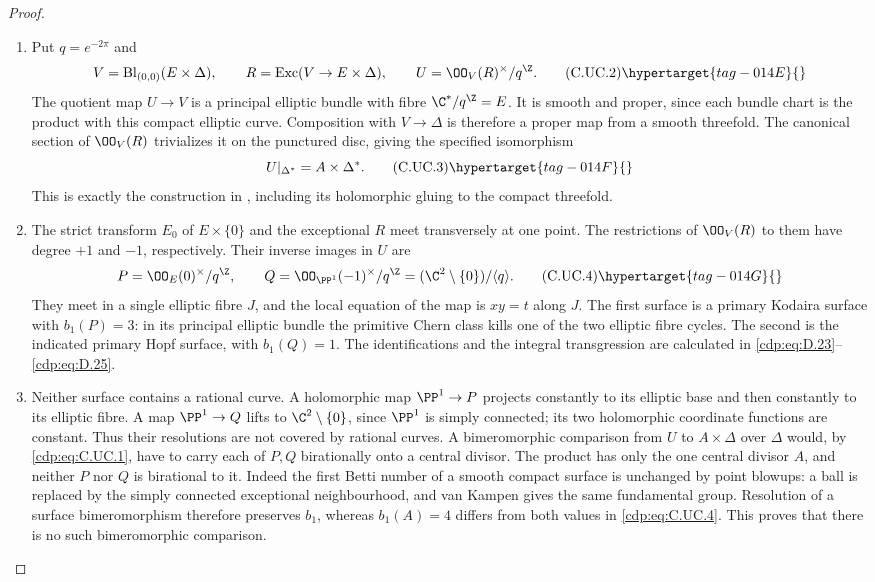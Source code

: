 \begin{proof}
\begin{enumerate}[label=\arabic*.,leftmargin=*]
\item Put
$q=e^{-2\pi}$ and
\[
 V=\operatorname{Bl}_{(0,0)}(E\times\Delta),
 \qquad R=\operatorname{Exc}(V\to E\times\Delta),
 \qquad U=\OO_V(R)^\times/q^{\Z}.
\tag{C.UC.2}\hypertarget{tag-014E}{}\label{cdp:eq:C.UC.2}
\]
The quotient map $U\to V$ is a principal
elliptic bundle with fibre $\C^*/q^{\Z}=E$.
It is smooth and proper, since each bundle
chart is the product with this compact
elliptic curve. Composition with $V\to\Delta$
is therefore a proper map from a smooth
threefold. The canonical section of
$\OO_V(R)$ trivializes it on the punctured
disc, giving the specified isomorphism
\[
                         U|_{\Delta^*}=A\times\Delta^*.
\tag{C.UC.3}\hypertarget{tag-014F}{}\label{cdp:eq:C.UC.3}
\]
This is exactly the construction in ,
including its holomorphic gluing to the
compact threefold.

\item The strict transform $E_0$ of $E\times\{0\}$
and the exceptional $R$ meet transversely at
one point. The restrictions of $\OO_V(R)$
to them have degree $+1$ and $-1$,
respectively. Their inverse images in $U$
are
\[
 P=\OO_E(0)^\times/q^{\Z},\qquad
 Q=\OO_{\PP^1}(-1)^\times/q^{\Z}
       =(\C^2\setminus\{0\})/\langle q\rangle.
\tag{C.UC.4}\hypertarget{tag-014G}{}\label{cdp:eq:C.UC.4}
\]
They meet in a single elliptic fibre $J$,
and the local equation of the map is
$xy=t$ along $J$. The first surface is a
primary Kodaira surface with $b_1(P)=3$:
in its principal elliptic bundle the primitive
Chern class kills one of the two elliptic
fibre cycles. The second is the indicated
primary Hopf surface, with $b_1(Q)=1$.
The identifications and the integral
transgression are calculated in
\eqref{cdp:eq:D.23}--\eqref{cdp:eq:D.25}.

\item Neither surface contains a rational curve.
A holomorphic map $\PP^1\to P$ projects
constantly to its elliptic base and then
constantly to its elliptic fibre. A map
$\PP^1\to Q$ lifts to $\C^2\setminus\{0\}$,
since $\PP^1$ is simply connected; its two
holomorphic coordinate functions are constant.
Thus their resolutions are not covered by
rational curves. A bimeromorphic comparison
from $U$ to $A\times\Delta$ over $\Delta$
would, by \eqref{cdp:eq:C.UC.1}, have to carry each of
$P,Q$ birationally onto a central divisor.
The product has only the one central
divisor $A$, and neither $P$ nor $Q$ is
birational to it. Indeed the first Betti
number of a smooth compact surface is
unchanged by point blowups: a ball is
replaced by the simply connected exceptional
neighbourhood, and van Kampen gives the
same fundamental group. Resolution of a
surface bimeromorphism therefore preserves
$b_1$, whereas $b_1(A)=4$ differs from
both values in \eqref{cdp:eq:C.UC.4}. This proves that
there is no such bimeromorphic comparison.


\end{enumerate}
\end{proof}
